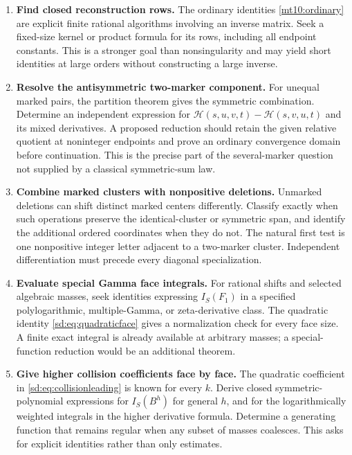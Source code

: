 \documentclass[11pt,a4paper]{article}
\numberwithin{equation}{section}
\theoremstyle{definition}
\theoremstyle{remark}
\begin{document}
\begin{enumerate}[label=\textbf{R\arabic*.}]
\item \textbf{Find closed reconstruction rows.}
The ordinary identities \eqref{mt10:ordinary} are explicit finite
rational algorithms involving an inverse matrix. Seek a fixed-size
kernel or product formula for its rows, including all endpoint
constants. This is a stronger goal than nonsingularity and may yield
short identities at large orders without constructing a large inverse.

\item \textbf{Resolve the antisymmetric two-marker component.}
For unequal marked pairs, the partition theorem gives the symmetric
combination. Determine an independent expression for
$\mathcal H(s,u,v,t)-\mathcal H(s,v,u,t)$ and its mixed derivatives.
A proposed reduction should retain the given relative quotient at
noninteger endpoints and prove an ordinary convergence domain before
continuation. This is the precise part of the several-marker question
not supplied by a classical symmetric-sum law.

\item \textbf{Combine marked clusters with nonpositive deletions.}
Unmarked deletions can shift distinct marked centers differently.
Classify exactly when such operations preserve the identical-cluster
or symmetric span, and identify the additional ordered coordinates
when they do not. The natural first test is one nonpositive integer
letter adjacent to a two-marker cluster. Independent differentiation
must precede every diagonal specialization.

\item \textbf{Evaluate special Gamma face integrals.}
For rational shifts and selected algebraic masses, seek identities
expressing $I_S(F_1)$ in a specified polylogarithmic, multiple-Gamma,
or zeta-derivative class. The quadratic identity
\eqref{sd:eq:quadraticface} gives a normalization check for every face
size. A finite exact integral is already available at arbitrary masses;
a special-function reduction would be an additional theorem.

\item \textbf{Give higher collision coefficients face by face.}
The quadratic coefficient in \eqref{sd:eq:collisionleading} is known
for every $k$. Derive closed symmetric-polynomial expressions for
$I_S(B^h)$ for general $h$, and for the logarithmically weighted
integrals in the higher derivative formula. Determine a generating
function that remains regular when any subset of masses coalesces.
This asks for explicit identities rather than only estimates.


\end{enumerate}
\end{document}
